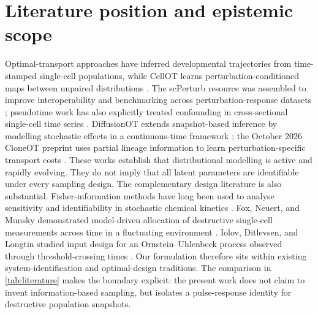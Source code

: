 \documentclass[11pt,a4paper]{article}
\begin{document}
\section{Literature position and epistemic scope}
Optimal-transport approaches have inferred developmental trajectories from time-stamped single-cell populations, while CellOT learns perturbation-conditioned maps between unpaired distributions \citep{schiebinger2019,bunne2023}. The scPerturb resource was assembled to improve interoperability and benchmarking across perturbation-response datasets \citep{peidli2024}; pseudotime work has also explicitly treated confounding in cross-sectional single-cell time series \citep{reid2016}. DiffusionOT extends snapshot-based inference by modelling stochastic effects in a continuous-time framework \citep{liu2026}; the October 2026 CloneOT preprint uses partial lineage information to learn perturbation-specific transport costs \citep{chen2026}. These works establish that distributional modelling is active and rapidly evolving. They do not imply that all latent parameters are identifiable under every sampling design.
The complementary design literature is also substantial. Fisher-information methods have long been used to analyse sensitivity and identifiability in stochastic chemical kinetics \citep{komorowski2011}. Fox, Neuert, and Munsky demonstrated model-driven allocation of destructive single-cell measurements across time in a fluctuating environment \citep{fox2020}. Iolov, Ditlevsen, and Longtin studied input design for an Ornstein--Uhlenbeck process observed through threshold-crossing times \citep{iolov2017}. Our formulation therefore sits within existing system-identification and optimal-design traditions. The comparison in \cref{tab:literature} makes the boundary explicit: the present work does not claim to invent information-based sampling, but isolates a pulse-response identity for destructive population snapshots.
\end{document}
